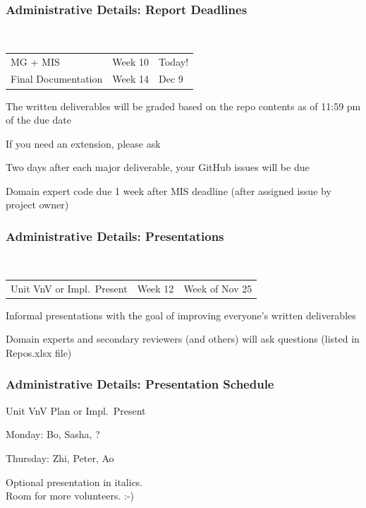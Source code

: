 \documentclass[t,12pt,numbers,fleqn]{beamer}
\begin{document}
\begin{frame}
\frametitle{Administrative Details: Report Deadlines}
~\newline
\begin{tabular}{l l l}
MG + MIS & Week 10 & Today!\\
Final Documentation & Week 14 & Dec 9\\
\end {tabular}

\bi
\item The written deliverables will be graded based on the repo contents as of
11:59 pm of the due date
\item If you need an extension, please ask
\item Two days after each major deliverable, your GitHub issues will be due
\item Domain expert code due 1 week after MIS deadline (after assigned issue by
  project owner)
\ei

\end{frame}


\begin{frame}
\frametitle{Administrative Details: Presentations}

~\newline
\begin{tabular}{l l l}
Unit VnV or Impl.\ Present & Week 12 & Week of Nov 25\\
\end {tabular}

\bi
\item Informal presentations with the goal of improving everyone's written
  deliverables
\item Domain experts and secondary reviewers (and others) will ask questions
  (listed in Repos.xlsx file)
\ei

\end{frame}


\begin{frame}
\frametitle{Administrative Details: Presentation Schedule}

\bi
\item Unit VnV Plan or Impl.\ Present
\bi
\item Monday: Bo, Sasha, ?
\item Thursday: Zhi, Peter, Ao
\ei
\ei

Optional presentation in italics.\\
Room for more volunteers.  :-)

\end{frame}
\end{document}
